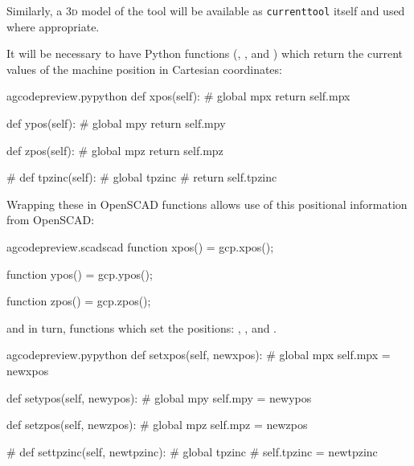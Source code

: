 \documentclass{ltxdoc}
\begin{document}
Similarly, a \textsc{3d} model of the tool will be available as \verb|currenttool| itself and used where appropriate.

It will be necessary to have Python functions (, , and ) which return the current values of the machine position in Cartesian coordinates: 

\lstset{firstnumber=\thegcpy}
\begin{writecode}{a}{gcodepreview.py}{python}
    def xpos(self):
#        global mpx
        return self.mpx

    def ypos(self):
#        global mpy
        return self.mpy

    def zpos(self):
#        global mpz
        return self.mpz

#    def tpzinc(self):
#        global tpzinc
#        return self.tpzinc

\end{writecode}
\addtocounter{gcpy}{16}

Wrapping these in OpenSCAD functions allows use of this positional information from OpenSCAD:

\lstset{firstnumber=\thegcpscad}
\begin{writecode}{a}{gcodepreview.scad}{scad}
function xpos() = gcp.xpos();

function ypos() = gcp.ypos();

function zpos() = gcp.zpos();

\end{writecode}
\addtocounter{gcpscad}{6}

\noindent and in turn, functions which set the positions: 
, 
, and
.%

\lstset{firstnumber=\thegcpy}
\begin{writecode}{a}{gcodepreview.py}{python}
    def setxpos(self, newxpos):
#        global mpx
        self.mpx = newxpos

    def setypos(self, newypos):
#        global mpy
        self.mpy = newypos

    def setzpos(self, newzpos):
#        global mpz
        self.mpz = newzpos
     
#    def settpzinc(self, newtpzinc):
#        global tpzinc
#        self.tpzinc = newtpzinc

\end{writecode}
\addtocounter{gcpy}{16}
 
\end{document}
